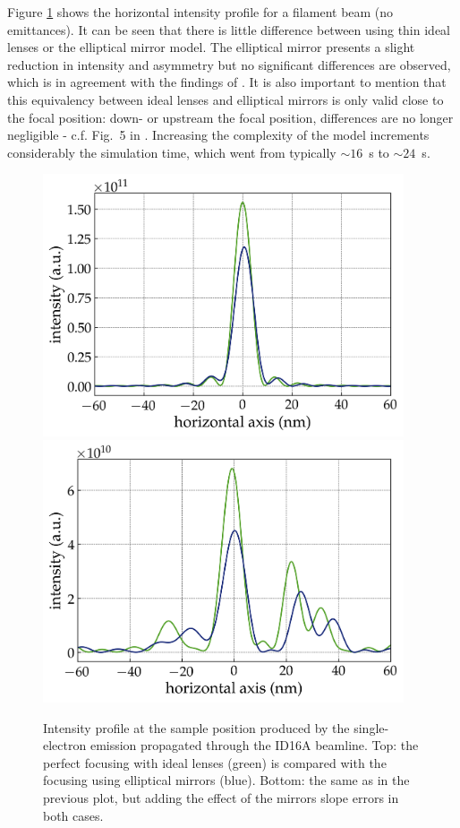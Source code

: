 \documentclass{iucr}              %
\begin{document}
Figure \ref{fig:SingleElectron} shows the horizontal intensity profile for a filament beam (no emittances). It can be seen that there is little difference between using thin ideal lenses or the elliptical mirror model. The elliptical mirror presents a slight reduction in intensity and asymmetry but no significant differences are observed, which is in agreement with the findings of \cite{Canestrari2014}. It is also important to mention that this equivalency between ideal lenses and elliptical mirrors is only valid close to the focal position: down- or upstream the focal position, differences are no longer negligible - c.f. Fig.~5 in \cite{Canestrari2014}.  Increasing the complexity of the model increments considerably the simulation time, which went from typically $\sim16$~s to $\sim24$~s. 

\begin{figure}
    \centering
        \includegraphics[width=0.95\textwidth]{GRAPHICS/filament_beam_ideal.png}
        \includegraphics[width=0.95\textwidth]{GRAPHICS/filament_beam_real.png}
    \label{fig:SingleElectron}
    \caption{Intensity profile at the sample position produced by the single-electron emission propagated through the ID16A beamline. Top: the perfect focusing with ideal lenses (green) is compared with the focusing using elliptical mirrors (blue). Bottom: the same as in the previous plot, but adding the effect of the mirrors slope errors in both cases.}
\end{figure}
\end{document}
